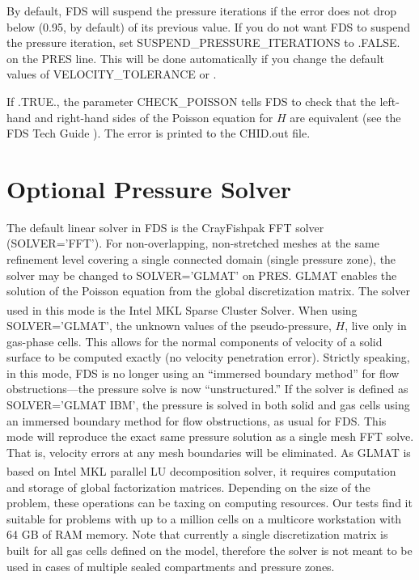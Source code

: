 \documentclass[11pt]{book}
\begin{document}
By default, FDS will suspend the pressure iterations if the error does not drop below  (0.95, by default) of its previous value. If you do not want FDS to suspend the pressure iteration, set {\ct SUSPEND\_PRESSURE\_ITERATIONS} to {\ct .FALSE.} on the {\ct PRES} line. This will be done automatically if you change the default values of {\ct VELOCITY\_TOLERANCE} or .

If {\ct .TRUE.}, the parameter {\ct CHECK\_POISSON} tells FDS to check that the left-hand and right-hand sides of the Poisson equation for $H$ are equivalent (see the FDS Tech Guide \cite{FDS_Math_Guide}).  The error is printed to the {\ct CHID.out} file.


\section{Optional Pressure Solver}

The default linear solver in FDS is the CrayFishpak FFT solver ({\ct SOLVER='FFT'}).  For non-overlapping, non-stretched meshes at the same refinement level covering a single connected domain (single pressure zone), the solver may be changed to {\ct SOLVER='GLMAT'} on {\ct PRES}. GLMAT enables the solution of the Poisson equation from the global discretization matrix. The solver used in this mode is the Intel\textsuperscript{\textregistered} MKL Sparse Cluster Solver. When using {\ct SOLVER='GLMAT'}, the unknown values of the pseudo-pressure, $H$, live only in gas-phase cells.  This allows for the normal components of velocity of a solid surface to be computed exactly (no velocity penetration error).  Strictly speaking, in this mode, FDS is no longer using an ``immersed boundary method'' for flow obstructions---the pressure solve is now ``unstructured.'' If the solver is defined as {\ct SOLVER='GLMAT IBM'}, the pressure is solved in both solid and gas cells using an immersed boundary method for flow obstructions, as usual for FDS.  This mode will reproduce the exact same pressure solution as a single mesh FFT solve.  That is, velocity errors at any mesh boundaries will be eliminated. As GLMAT is based on Intel\textsuperscript{\textregistered} MKL parallel LU decomposition solver, it requires computation and storage of global factorization matrices. Depending on the size of the problem, these operations can be taxing on computing resources. Our tests find it suitable for problems with up to a million cells on a multicore workstation with 64 GB of RAM memory. Note that currently a single discretization matrix is built for all gas cells defined on the model, therefore the solver is not meant to be used in cases of multiple sealed compartments and pressure zones.
\end{document}
